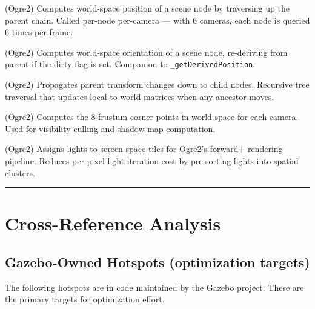 \documentclass[11pt, a4paper]{article}
\begin{document}
\begin{description}[style=nextline, leftmargin=1.5cm]
\item[\texttt{Ogre::Node::\_getDerivedPosition}] (Ogre2) Computes world-space position of a scene node by traversing up the parent chain. Called per-node per-camera --- with 6 cameras, each node is queried 6 times per frame.
\item[\texttt{Ogre::Node::\_getDerivedOrientationUpdated}] (Ogre2) Computes world-space orientation of a scene node, re-deriving from parent if the dirty flag is set. Companion to \texttt{\_getDerivedPosition}.
\item[\texttt{Ogre::Node::updateFromParentImpl}] (Ogre2) Propagates parent transform changes down to child nodes. Recursive tree traversal that updates local-to-world matrices when any ancestor moves.
\item[\texttt{Ogre::Frustum::updateWorldSpaceCornersImpl}] (Ogre2) Computes the 8 frustum corner points in world-space for each camera. Used for visibility culling and shadow map computation.
\item[\texttt{Ogre::ForwardClustered::collectLightForSlice}] (Ogre2) Assigns lights to screen-space tiles for Ogre2's forward+ rendering pipeline. Reduces per-pixel light iteration cost by pre-sorting lights into spatial clusters.
\end{description}

\begin{center}\rule{0.5\linewidth}{0.5pt}\end{center}

\hypertarget{cross-reference-analysis}{%
\section{Cross-Reference
Analysis}\label{cross-reference-analysis}}

\subsection{Gazebo-Owned Hotspots (optimization targets)}

The following hotspots are in code maintained by the Gazebo project. These are the primary targets for optimization effort.
\end{document}
